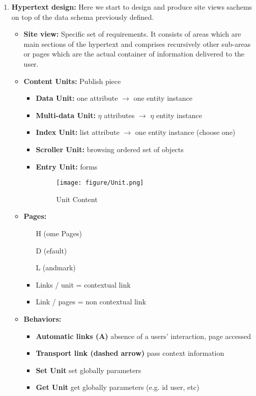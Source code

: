 \documentclass[a4paper]{memoir}
\begin{document}
\begin{enumerate}
\begin{enumerate}
			\item \textbf{Hypertext design:} Here we start to design and produce site views sachems on top of the data schema previously defined.
			\begin{itemize}
				\item \textbf{Site view:} Specific set of requirements. It consists of areas which are main sections of the hypertext and comprises recursively other sub-areas or pages which are the actual container of information delivered to the user.
				\item \textbf{Content Units:} Publish piece
				\begin{itemize}
					\item \textbf{Data Unit:} one attribute $\rightarrow$ one entity instance
					\item \textbf{Multi-data Unit:} $\eta$ attributes $\rightarrow$ $\eta$ entity instance
					\item \textbf{Index Unit:} list attribute $\rightarrow$ one entity instance  (choose one)
					\item \textbf{Scroller Unit:} browsing ordered set of objects
					\item \textbf{Entry Unit:} forms
					\begin{figure}[here]
						\texttt{[image: figure/Unit.png]}
						\caption{Unit Content}
						\label{fig:Unit}
					\end{figure}
				\end{itemize}
				\item \textbf{Pages:}
				\begin{itemize}
					\item[H] (ome Pages) 
					\item[D] (efault)
					\item[L] (andmark)
					\item Links / unit = contextual link
					\item Link / pages = non contextual link
				\end{itemize}
				\item \textbf{Behaviors:}
				\begin{itemize}
					\item \textbf{Automatic links (A)} absence of a users' interaction, page accessed
					\item \textbf{Transport link (dashed arrow)} pass context information
					\item \textbf{Set Unit} set globally parameters
					\item \textbf{Get Unit} get globally parameters (e.g. id user, etc)

\end{itemize}
\end{itemize}
\end{enumerate}
\end{enumerate}
\end{document}
